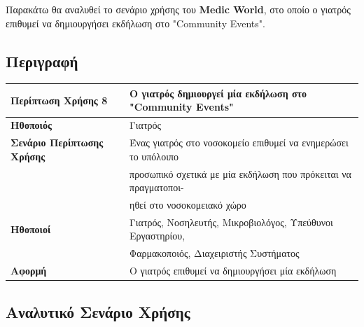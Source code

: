 \documentclass{article}
\newcommand\T{\rule{0pt}{2.6ex}}       %
\newcommand\B{\rule[-1.2ex]{0pt}{0pt}}
\begin{document}
Παρακάτω θα αναλυθεί το σενάριο χρήσης του \textbf{Medic World}, στο οποίο ο γιατρός επιθυμεί να δημιουργήσει εκδήλωση στο "Community Events".

\subsection{Περιγραφή}

\begin{center}
     \begin{tabular}{|l|l|}
     \hline
      \textbf{Περίπτωση Χρήσης 8} & Ο γιατρός δημιουργεί μία εκδήλωση στο "Community Events" \T\B \\ 
      \hline
      \textbf{Ηθοποιός} & Γιατρός \T\B \\
      \hline
      \textbf{Σενάριο Περίπτωσης Χρήσης} & Ένας γιατρός στο νοσοκομείο επιθυμεί να ενημερώσει το υπόλοιπο\T\\& προσωπικό σχετικά με μία εκδήλωση  που πρόκειται να πραγματοποι- \\& ηθεί στο νοσοκομειακό χώρο \B \\
      \hline
      \textbf{Ηθοποιοί} & Γιατρός, Νοσηλευτής, Μικροβιολόγος, Υπεύθυνοι Εργαστηρίου, \T \\& Φαρμακοποιός, Διαχειριστής Συστήματος \B \\
      \hline
      \textbf{Αφορμή} &  Ο γιατρός επιθυμεί να δημιουργήσει μία εκδήλωση\T\B \\
      \hline
     \end{tabular}
 \end{center}
 
 \subsection{Αναλυτικό Σενάριο Χρήσης}
\end{document}
